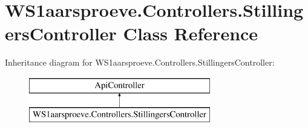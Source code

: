 \hypertarget{class_w_s1aarsproeve_1_1_controllers_1_1_stillingers_controller}{}\section{W\+S1aarsproeve.\+Controllers.\+Stillingers\+Controller Class Reference}
\label{class_w_s1aarsproeve_1_1_controllers_1_1_stillingers_controller}
Inheritance diagram for W\+S1aarsproeve.\+Controllers.\+Stillingers\+Controller\+:\begin{figure}[H]
\begin{center}
\leavevmode
\includegraphics[height=2.000000cm]{class_w_s1aarsproeve_1_1_controllers_1_1_stillingers_controller}
\end{center}
\end{figure}
